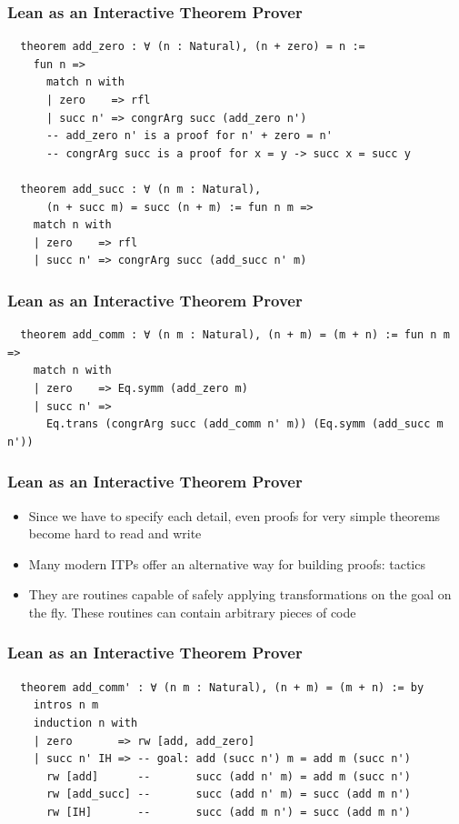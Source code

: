 \documentclass[usepdftitle=false,aspectratio=169,usenames,dvipsnames]{beamer}
\newcommand\vitem{\vfill\item}
\begin{document}
\begin{frame}[fragile]
  \frametitle{Lean as an Interactive Theorem Prover}
  \begin{verbatim}
  theorem add_zero : ∀ (n : Natural), (n + zero) = n :=
    fun n =>
      match n with
      | zero    => rfl
      | succ n' => congrArg succ (add_zero n')
      -- add_zero n' is a proof for n' + zero = n'
      -- congrArg succ is a proof for x = y -> succ x = succ y

  theorem add_succ : ∀ (n m : Natural),
      (n + succ m) = succ (n + m) := fun n m =>
    match n with
    | zero    => rfl
    | succ n' => congrArg succ (add_succ n' m)
  \end{verbatim}
\end{frame}
\begin{frame}[fragile]
  \frametitle{Lean as an Interactive Theorem Prover}
  \begin{verbatim}
  theorem add_comm : ∀ (n m : Natural), (n + m) = (m + n) := fun n m =>
    match n with
    | zero    => Eq.symm (add_zero m)
    | succ n' =>
      Eq.trans (congrArg succ (add_comm n' m)) (Eq.symm (add_succ m n'))
  \end{verbatim}
\end{frame}

\begin{frame}
  \frametitle{Lean as an Interactive Theorem Prover}
  \begin{itemize}
    \item Since we have to specify each detail, even proofs for very simple theorems become hard to read and write
    \vitem Many modern ITPs offer an alternative way for building proofs: tactics
    \vitem They are routines capable of safely applying transformations on the goal on the fly. These routines can contain arbitrary pieces of code
  \end{itemize}
\end{frame}

\begin{frame}[fragile]
  \frametitle{Lean as an Interactive Theorem Prover}
  \begin{verbatim}
  theorem add_comm' : ∀ (n m : Natural), (n + m) = (m + n) := by
    intros n m
    induction n with
    | zero       => rw [add, add_zero]
    | succ n' IH => -- goal: add (succ n') m = add m (succ n')
      rw [add]      --       succ (add n' m) = add m (succ n')
      rw [add_succ] --       succ (add n' m) = succ (add m n')
      rw [IH]       --       succ (add m n') = succ (add m n')
  \end{verbatim}

\end{frame}
\end{document}
